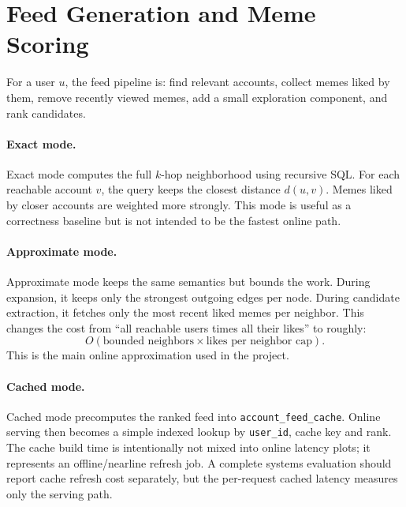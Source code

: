 \documentclass[11pt,a4paper]{article}
\begin{document}
\section{Feed Generation and Meme Scoring}
For a user $u$, the feed pipeline is: find relevant accounts, collect memes liked by them, remove recently viewed memes, add a small exploration component, and rank candidates.

\paragraph{Exact mode.} Exact mode computes the full $k$-hop neighborhood using recursive SQL. For each reachable account $v$, the query keeps the closest distance $d(u,v)$. Memes liked by closer accounts are weighted more strongly. This mode is useful as a correctness baseline but is not intended to be the fastest online path.

\paragraph{Approximate mode.} Approximate mode keeps the same semantics but bounds the work. During expansion, it keeps only the strongest outgoing edges per node. During candidate extraction, it fetches only the most recent liked memes per neighbor. This changes the cost from ``all reachable users times all their likes'' to roughly:
\[
O(\text{bounded neighbors} \times \text{likes per neighbor cap}).
\]
This is the main online approximation used in the project.

\paragraph{Cached mode.} Cached mode precomputes the ranked feed into \texttt{account\_feed\_cache}. Online serving then becomes a simple indexed lookup by \texttt{user\_id}, cache key and rank. The cache build time is intentionally not mixed into online latency plots; it represents an offline/nearline refresh job. A complete systems evaluation should report cache refresh cost separately, but the per-request cached latency measures only the serving path.
\end{document}
